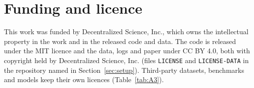 \section*{Funding and licence}

This work was funded by Decentralized Science, Inc., which owns the intellectual property in the work and in the released code and data. The code is released under the MIT licence and the data, logs and paper under CC BY 4.0, both with copyright held by Decentralized Science, Inc. (files \texttt{LICENSE} and \texttt{LICENSE-DATA} in the repository named in Section~\ref{sec:setup}). Third-party datasets, benchmarks and models keep their own licences (Table~\ref{tab:A3}).
